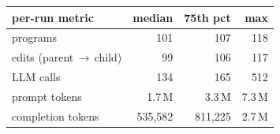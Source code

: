 \begin{tabular}{lrrr}
\toprule
per-run metric & median & 75th pct & max \\
\midrule
programs                   & 101 & 107 & 118 \\
edits (parent\,\(\rightarrow\)\,child) & 99 & 106 & 117 \\
LLM calls                  & 134 & 165 & 512 \\
prompt tokens              & 1.7\,M & 3.3\,M & 7.3\,M \\
completion tokens          & 535{,}582 & 811{,}225 & 2.7\,M \\
\bottomrule
\end{tabular}
